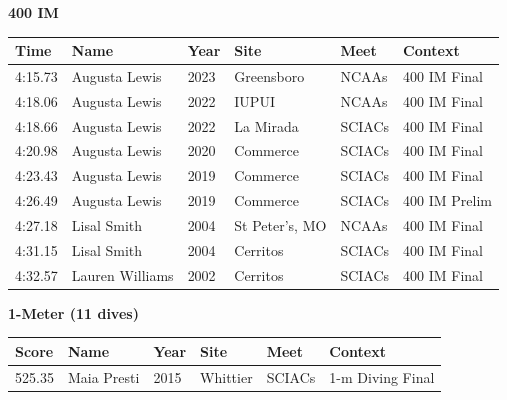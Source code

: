 \noindent\begin{minipage}[t]{0.98\textwidth}
\centering
\textbf{\textcolor{teamprimary}{400 IM}}\par
\vspace{0.5em}
\centering
\small
\renewcommand{\arraystretch}{1.0}
\setlength{\tabcolsep}{4pt}
\begin{tabular}{@{}p{2.0cm}p{3.2cm}p{1.2cm}p{2.0cm}p{2.0cm}p{2.5cm}@{}}
\toprule
\textbf{Time} & \textbf{Name} & \textbf{Year} & \textbf{Site} & \textbf{Meet} & \textbf{Context} \\
\midrule
4:15.73 & Augusta Lewis & 2023 & Greensboro & NCAAs & 400 IM Final \\
4:18.06 & Augusta Lewis & 2022 & IUPUI & NCAAs & 400 IM Final \\
4:18.66 & Augusta Lewis & 2022 & La Mirada & SCIACs & 400 IM Final \\
4:20.98 & Augusta Lewis & 2020 & Commerce & SCIACs & 400 IM Final \\
4:23.43 & Augusta Lewis & 2019 & Commerce & SCIACs & 400 IM Final \\
4:26.49 & Augusta Lewis & 2019 & Commerce & SCIACs & 400 IM Prelim \\
4:27.18 & Lisal Smith & 2004 & St Peter's, MO & NCAAs & 400 IM Final \\
4:31.15 & Lisal Smith & 2004 & Cerritos & SCIACs & 400 IM Final \\
4:32.57 & Lauren Williams & 2002 & Cerritos & SCIACs & 400 IM Final \\
\bottomrule
\end{tabular}
\end{minipage}
\vspace{1.2em}
\noindent\begin{minipage}[t]{0.98\textwidth}
\centering
\textbf{\textcolor{teamprimary}{1-Meter (11 dives)}}\par
\vspace{0.5em}
\centering
\small
\renewcommand{\arraystretch}{1.0}
\setlength{\tabcolsep}{4pt}
\begin{tabular}{@{}p{2.0cm}p{3.2cm}p{1.2cm}p{2.0cm}p{2.0cm}p{2.5cm}@{}}
\toprule
\textbf{Score} & \textbf{Name} & \textbf{Year} & \textbf{Site} & \textbf{Meet} & \textbf{Context} \\
\midrule
525.35 & Maia Presti & 2015 & Whittier & SCIACs & 1-m Diving Final \\
\bottomrule
\end{tabular}
\end{minipage}
\vspace{1.2em}
